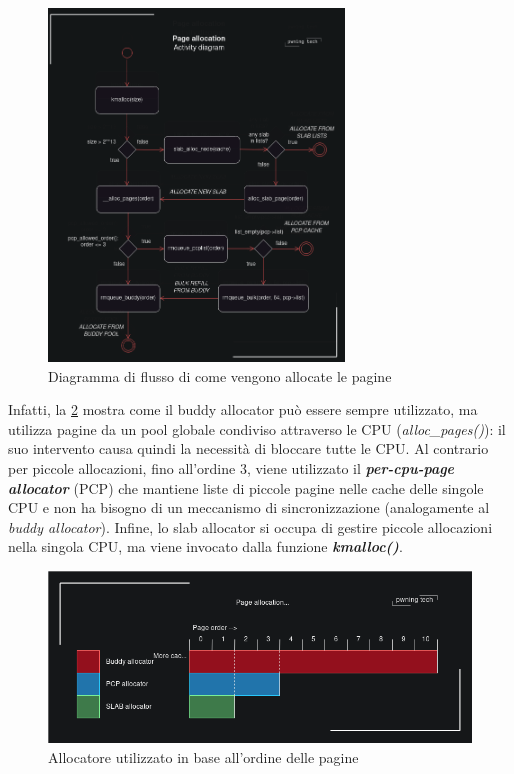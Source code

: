 \documentclass{article}
\begin{document}
\begin{figure}[h]
  \begin{center}
    \includegraphics[width=0.7\textwidth]{figures/ch1/activity-diagram-allocator.png}
  \end{center}
  \caption{Diagramma di flusso di come vengono allocate le pagine}\label{fig:flowchart-page-allocator}
\end{figure}


Infatti, la \cref{fig:allocator-per-order}\cite{NetfilterTablesVulnerability}
mostra come il buddy allocator può essere sempre utilizzato, ma utilizza pagine da un pool globale 
condiviso attraverso le CPU (\textit{alloc\_pages()}): il suo intervento causa quindi la 
necessità di bloccare tutte le CPU. Al contrario per piccole allocazioni, fino all'ordine 
$3$, viene utilizzato il \textbf{\textit{per-cpu-page allocator}} (PCP) che mantiene liste 
di piccole pagine nelle cache delle singole CPU e non ha bisogno di un meccanismo di sincronizzazione 
(analogamente al \textit{buddy allocator}). Infine, lo slab allocator si occupa di 
gestire piccole allocazioni nella singola CPU, ma viene invocato dalla funzione 
\textbf{\textit{kmalloc()}}.

\begin{figure}[h]
  \begin{center}
    \includegraphics[width=.75\textwidth]{figures/ch1/allocator-per-order.png}
  \end{center}
  \caption{Allocatore utilizzato in base all'ordine delle pagine}\label{fig:allocator-per-order}
\end{figure}
\end{document}

